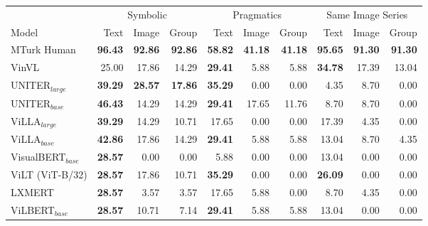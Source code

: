 \begin{table}[ht]
    \centering
   \begin{adjustbox}{max width=\textwidth}
  \begin{tabular}{l|rrr|rrr|rrr}
    \toprule
     &
      \multicolumn{3}{c|}{Symbolic} &
      \multicolumn{3}{c|}{Pragmatics} &
      \multicolumn{3}{c}{Same Image Series} \\
    Model & Text & Image & Group & Text & Image & Group & Text & Image & Group \\\midrule
 MTurk Human                  & \textbf{96.43} & \textbf{92.86} & \textbf{92.86} & \textbf{58.82} & \textbf{41.18} & \textbf{41.18} & \textbf{95.65} & \textbf{91.30} & \textbf{91.30} \\
 VinVL                        & 25.00          & 17.86          & 14.29          & \textbf{29.41} & 5.88           & 5.88           & \textbf{34.78} & 17.39          & 13.04          \\
 UNITER$_{large}$             & \textbf{39.29} & \textbf{28.57} & \textbf{17.86} & \textbf{35.29} & 0.00           & 0.00           & 4.35           & 8.70           & 0.00           \\
 UNITER$_{base}$              & \textbf{46.43} & 14.29          & 14.29          & \textbf{29.41} & 17.65          & 11.76          & 8.70           & 8.70           & 0.00           \\
 ViLLA$_{large}$              & \textbf{39.29} & 14.29          & 10.71          & 17.65          & 0.00           & 0.00           & 17.39          & 4.35           & 0.00           \\
 ViLLA$_{base}$               & \textbf{42.86} & 17.86          & 14.29          & \textbf{29.41} & 5.88           & 5.88           & 13.04          & 8.70           & 4.35           \\
 VisualBERT$_{base}$          & \textbf{28.57} & 0.00           & 0.00           & 5.88           & 0.00           & 0.00           & 13.04          & 0.00           & 0.00           \\
 ViLT (ViT-B/32)              & \textbf{28.57} & 17.86          & 10.71          & \textbf{35.29} & 0.00           & 0.00           & \textbf{26.09} & 0.00           & 0.00           \\
 LXMERT                       & \textbf{28.57} & 3.57           & 3.57           & 17.65          & 5.88           & 0.00           & 8.70           & 4.35           & 0.00           \\
 ViLBERT$_{base}$             & \textbf{28.57} & 10.71          & 7.14           & \textbf{29.41} & 5.88           & 5.88           & 13.04          & 0.00           & 0.00           \\

\end{tabular}
\end{adjustbox}
\end{table}
